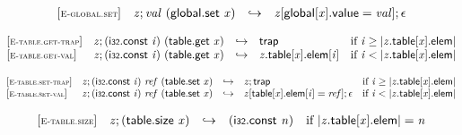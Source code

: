 $$
\begin{array}{@{}l@{}lcl@{}l@{}}
{[\textsc{\scriptsize E{-}global.set}]} \quad & {\mathit{z}} ; {\mathit{val}}~(\mathsf{global.set}~{\mathit{x}}) &\hookrightarrow& {\mathit{z}}{}[\mathsf{global}{}[{\mathit{x}}].\mathsf{value} = {\mathit{val}}] ; \epsilon &  \\
\end{array}
$$

\vspace{1ex}

$$
\begin{array}{@{}l@{}lcl@{}l@{}}
{[\textsc{\scriptsize E{-}table.get{-}trap}]} \quad & {\mathit{z}} ; (\mathsf{i{\scriptstyle32}}.\mathsf{const}~{\mathit{i}})~(\mathsf{table.get}~{\mathit{x}}) &\hookrightarrow& \mathsf{trap} &\quad
  \mbox{if}~{\mathit{i}} \geq {|{{\mathit{z}}.\mathsf{table}}{{}[{\mathit{x}}]}.\mathsf{elem}|} \\
{[\textsc{\scriptsize E{-}table.get{-}val}]} \quad & {\mathit{z}} ; (\mathsf{i{\scriptstyle32}}.\mathsf{const}~{\mathit{i}})~(\mathsf{table.get}~{\mathit{x}}) &\hookrightarrow& {{\mathit{z}}.\mathsf{table}}{{}[{\mathit{x}}]}.\mathsf{elem}{}[{\mathit{i}}] &\quad
  \mbox{if}~{\mathit{i}} < {|{{\mathit{z}}.\mathsf{table}}{{}[{\mathit{x}}]}.\mathsf{elem}|} \\
\end{array}
$$

$$
\begin{array}{@{}l@{}lcl@{}l@{}}
{[\textsc{\scriptsize E{-}table.set{-}trap}]} \quad & {\mathit{z}} ; (\mathsf{i{\scriptstyle32}}.\mathsf{const}~{\mathit{i}})~{\mathit{ref}}~(\mathsf{table.set}~{\mathit{x}}) &\hookrightarrow& {\mathit{z}} ; \mathsf{trap} &\quad
  \mbox{if}~{\mathit{i}} \geq {|{{\mathit{z}}.\mathsf{table}}{{}[{\mathit{x}}]}.\mathsf{elem}|} \\
{[\textsc{\scriptsize E{-}table.set{-}val}]} \quad & {\mathit{z}} ; (\mathsf{i{\scriptstyle32}}.\mathsf{const}~{\mathit{i}})~{\mathit{ref}}~(\mathsf{table.set}~{\mathit{x}}) &\hookrightarrow& {\mathit{z}}{}[\mathsf{table}{}[{\mathit{x}}].\mathsf{elem}{}[{\mathit{i}}] = {\mathit{ref}}] ; \epsilon &\quad
  \mbox{if}~{\mathit{i}} < {|{{\mathit{z}}.\mathsf{table}}{{}[{\mathit{x}}]}.\mathsf{elem}|} \\
\end{array}
$$

\vspace{1ex}

$$
\begin{array}{@{}l@{}lcl@{}l@{}}
{[\textsc{\scriptsize E{-}table.size}]} \quad & {\mathit{z}} ; (\mathsf{table.size}~{\mathit{x}}) &\hookrightarrow& (\mathsf{i{\scriptstyle32}}.\mathsf{const}~{\mathit{n}}) &\quad
  \mbox{if}~{|{{\mathit{z}}.\mathsf{table}}{{}[{\mathit{x}}]}.\mathsf{elem}|} = {\mathit{n}} \\
\end{array}
$$

